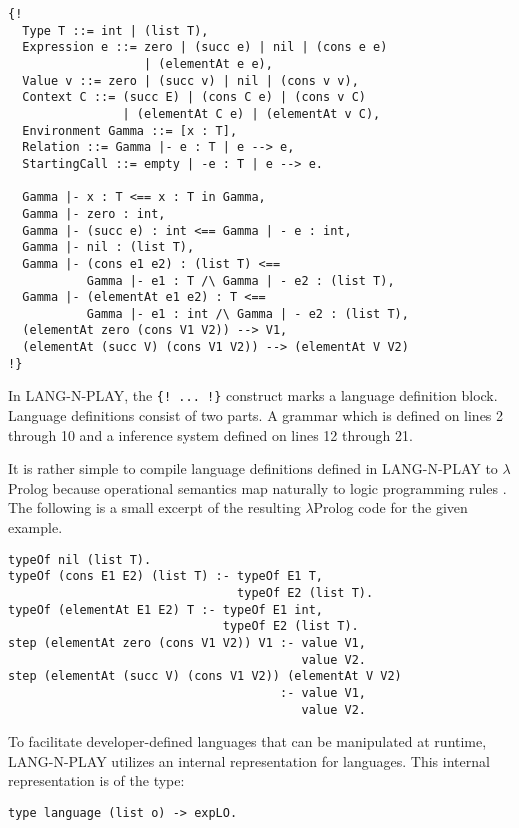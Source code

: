 \begin{lstlisting}
{!
  Type T ::= int | (list T),
  Expression e ::= zero | (succ e) | nil | (cons e e)
                   | (elementAt e e),
  Value v ::= zero | (succ v) | nil | (cons v v),
  Context C ::= (succ E) | (cons C e) | (cons v C)
                | (elementAt C e) | (elementAt v C),
  Environment Gamma ::= [x : T],
  Relation ::= Gamma |- e : T | e --> e,
  StartingCall ::= empty | -e : T | e --> e.

  Gamma |- x : T <== x : T in Gamma,
  Gamma |- zero : int,
  Gamma |- (succ e) : int <== Gamma | - e : int,
  Gamma |- nil : (list T),
  Gamma |- (cons e1 e2) : (list T) <==
           Gamma |- e1 : T /\ Gamma | - e2 : (list T),
  Gamma |- (elementAt e1 e2) : T <==
           Gamma |- e1 : int /\ Gamma | - e2 : (list T),
  (elementAt zero (cons V1 V2)) --> V1,
  (elementAt (succ V) (cons V1 V2)) --> (elementAt V V2)
!}
\end{lstlisting}

In LANG-N-PLAY, the \lstinline|{! ... !}| construct marks a language definition block. Language definitions consist of two parts. A grammar which is defined on lines 2 through 10 and a inference system defined on lines 12 through 21.

It is rather simple to compile language definitions defined in LANG-N-PLAY to $\lambda$Prolog because operational semantics map naturally to logic programming rules \cite{cimini_effectiveness_2020}. The following is a small excerpt of the resulting $\lambda$Prolog code for the given example.

\begin{lstlisting}
typeOf nil (list T).
typeOf (cons E1 E2) (list T) :- typeOf E1 T,
                                typeOf E2 (list T).
typeOf (elementAt E1 E2) T :- typeOf E1 int,
                              typeOf E2 (list T).
step (elementAt zero (cons V1 V2)) V1 :- value V1, 
                                         value V2.
step (elementAt (succ V) (cons V1 V2)) (elementAt V V2)
                                      :- value V1, 
                                         value V2.
\end{lstlisting}

To facilitate developer-defined languages that can be manipulated at runtime, LANG-N-PLAY utilizes an internal representation for languages. This internal representation is of the type:

\begin{lstlisting}
type language (list o) -> expLO.
\end{lstlisting}

